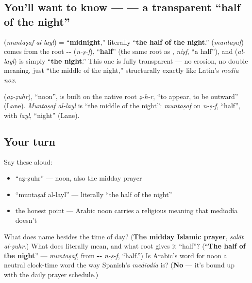\subsection*{You'll want to know —   — a transparent \textquotedblleft{}half of the night\textquotedblright{}}
\textbf{ } (\emph{muntaṣaf al-layl}) = \textquotedblleft{}\textbf{midnight},\textquotedblright{} literally \textquotedblleft{}\textbf{the half of the night}.\textquotedblright{} \textbf{} (\emph{muntaṣaf}) comes from the root \textbf{--} (\emph{n-ṣ-f}), \textquotedblleft{}\textbf{half}\textquotedblright{} (the same root as \textbf{}, \emph{niṣf}, \textquotedblleft{}a half\textquotedblright{}), and \textbf{} (\emph{al-layl}) is simply \textquotedblleft{}\textbf{the night}.\textquotedblright{} This one is fully transparent — no erosion, no double meaning, just \textquotedblleft{}the middle of the night,\textquotedblright{} structurally exactly like Latin's \emph{media nox}.

\begin{cousinweb}
\textbf{} (\emph{aẓ-ẓuhr}), \textquotedblleft{}noon\textquotedblright{}, is built on the native root \emph{ẓ-h-r}, \textquotedblleft{}to appear, to be outward\textquotedblright{} (Lane). \emph{Muntaṣaf al-layl} is \textquotedblleft{}the middle of the night\textquotedblright{}: \emph{muntaṣaf} on \emph{n-ṣ-f}, \textquotedblleft{}half\textquotedblright{}, with \emph{layl}, \textquotedblleft{}night\textquotedblright{} (Lane).
\end{cousinweb}

\subsection*{Your turn}
Say these aloud:

\begin{itemize}
\raggedright
  \item \textquotedblleft{}aẓ-ẓuhr\textquotedblright{} — noon, also the midday prayer
  \item \textquotedblleft{}muntaṣaf al-layl\textquotedblright{} — literally \textquotedblleft{}the half of the night\textquotedblright{}
  \item the honest point — Arabic noon carries a religious meaning that mediodía doesn't
\end{itemize}

\begin{tcolorbox}[breakable,colback=teal!4,colframe=teal!35!black,title={Before you move on}]
What does \textbf{} name besides the time of day? (\textbf{The midday Islamic prayer}, \emph{ṣalāt al-ẓuhr}.) What does \textbf{ } literally mean, and what root gives it \textquotedblleft{}half\textquotedblright{}? (\textquotedblleft{}\textbf{The half of the night}\textquotedblright{} — \emph{muntaṣaf}, from \textbf{--} \emph{n-ṣ-f}, \textquotedblleft{}half.\textquotedblright{}) Is Arabic's word for noon a neutral clock-time word the way Spanish's \emph{mediodía} is? (\textbf{No} — it's bound up with the daily prayer schedule.)
\end{tcolorbox}
